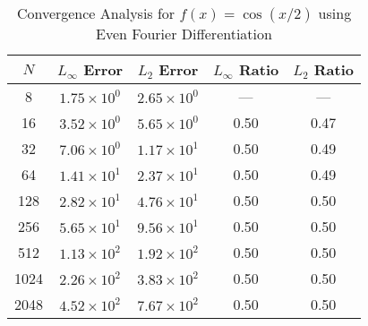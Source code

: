 \begin{table}[H]
	\centering
	\begin{tabular}{|c|c|c|c|c|}
		\hline
		$N$  & $L_\infty$ Error     & $L_2$ Error          & $L_\infty$ Ratio & $L_2$ Ratio \\
		\hline
		8    & $1.75 \times 10^{0}$ & $2.65 \times 10^{0}$ & ---              & ---         \\
		16   & $3.52 \times 10^{0}$ & $5.65 \times 10^{0}$ & 0.50             & 0.47        \\
		32   & $7.06 \times 10^{0}$ & $1.17 \times 10^{1}$ & 0.50             & 0.49        \\
		64   & $1.41 \times 10^{1}$ & $2.37 \times 10^{1}$ & 0.50             & 0.49        \\
		128  & $2.82 \times 10^{1}$ & $4.76 \times 10^{1}$ & 0.50             & 0.50        \\
		256  & $5.65 \times 10^{1}$ & $9.56 \times 10^{1}$ & 0.50             & 0.50        \\
		512  & $1.13 \times 10^{2}$ & $1.92 \times 10^{2}$ & 0.50             & 0.50        \\
		1024 & $2.26 \times 10^{2}$ & $3.83 \times 10^{2}$ & 0.50             & 0.50        \\
		2048 & $4.52 \times 10^{2}$ & $7.67 \times 10^{2}$ & 0.50             & 0.50        \\
		\hline
	\end{tabular}
	\caption{Convergence Analysis for $f(x) = \cos(x/2)$ using Even Fourier Differentiation}
	\label{tab:cosxhalf}
\end{table}


